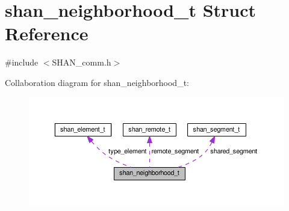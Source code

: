 \hypertarget{structshan__neighborhood__t}{}\section{shan\+\_\+neighborhood\+\_\+t Struct Reference}
\label{structshan__neighborhood__t}


{\ttfamily \#include $<$S\+H\+A\+N\+\_\+comm.\+h$>$}



Collaboration diagram for shan\+\_\+neighborhood\+\_\+t\+:\nopagebreak
\begin{figure}[H]
\begin{center}
\leavevmode
\includegraphics[width=350pt]{structshan__neighborhood__t__coll__graph}
\end{center}
\end{figure}
